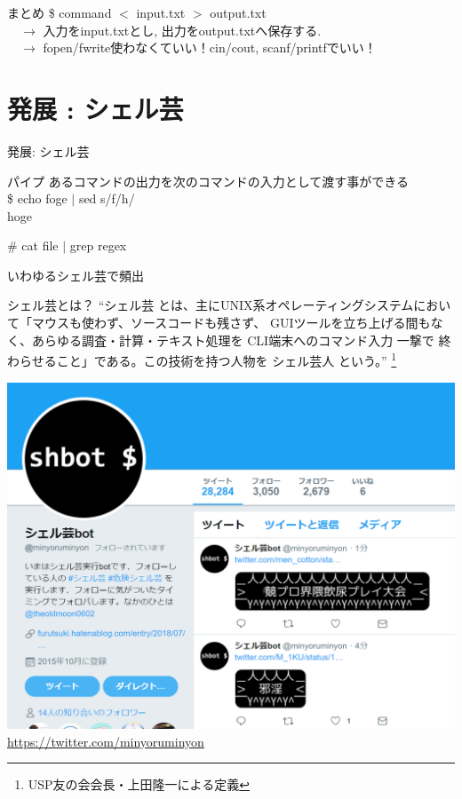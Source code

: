 \documentclass[uplatex, dvipdfmx, unicode]{beamer}
\begin{document}
\begin{frame}{まとめ}
  \$ command $<$ input.txt $>$ output.txt \\
  \ \ $\rightarrow$ 入力をinput.txtとし, 出力をoutput.txtへ保存する. \\
  \ \ $\rightarrow$ fopen/fwrite使わなくていい！cin/cout, scanf/printfでいい！
\end{frame}

\section{発展 : シェル芸}
\begin{frame}
  \centering
  \Huge{発展: シェル芸}
\end{frame}

\begin{frame}{パイプ}
  あるコマンドの出力を次のコマンドの入力として渡す事ができる \\
  \$ echo foge $|$ sed s/f/h/ \\
  hoge

  \# cat file $|$ grep regex

  \small いわゆるシェル芸で頻出
\end{frame}

\begin{frame}{シェル芸とは？}
  ``シェル芸 とは、主にUNIX系オペレーティングシステムにおいて「マウスも使わず、ソースコードも残さず、
  GUIツールを立ち上げる間もなく、あらゆる調査・計算・テキスト処理を CLI端末へのコマンド入力 一撃で
  終わらせること」である。この技術を持つ人物を シェル芸人 という。''
  \footnote{USP友の会会長・上田隆一による定義}
\end{frame}

\begin{frame}
  \centering
  \includegraphics[keepaspectratio, scale=.5]{./img/shellgei.png}\\
  \url{https://twitter.com/minyoruminyon}
\end{frame}
\end{document}
